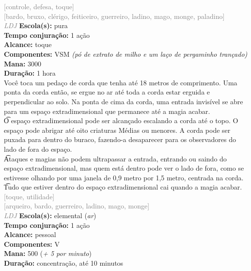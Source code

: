 \documentclass{RPG_Adventure}[2021/10/20]
\begin{document}
{\scriptsize \textcolor{gray}{[controle, defesa, toque]\\}}
{\scriptsize \textcolor{gray}{[bardo, bruxo, clérigo, feiticeiro, guerreiro, ladino, mago, monge, paladino]\\}}
{\tiny \textcolor{gray}{\textit{LDJ}}}\jump{}
{\small \t \textbf{Escola(s):} pura\\\t \textbf{Tempo conjuração:} 1 ação\\\t \textbf{Alcance:} toque\\\t \textbf{Componentes:} VSM \textit{(pó de extrato de milho e um laço de pergaminho trançado)}\\\t \textbf{Mana:} 3000\\\t \textbf{Duração:} 1 hora\\}
{\normalsize Você toca um pedaço de corda que tenha até 18 metros de comprimento. Uma ponta da corda então, se ergue no ar até toda a corda estar erguida e perpendicular ao solo. Na ponta de cima da corda, uma entrada invisível se abre para um espaço extradimensional que permanece até a magia acabar.\\\t O espaço extradimensional pode ser alcançado escalando a corda até o topo. O espaço pode abrigar até oito criaturas Médias ou menores. A corda pode ser puxada para dentro do buraco, fazendo-a desaparecer para os observadores do lado de fora do espaço.\\\t Ataques e magias não podem ultrapassar a entrada, entrando ou saindo do espaço extradimensional, mas quem está dentro pode ver o lado de fora, como se estivesse olhando por uma janela de 0,9 metro por 1,5 metro, centrada na corda.\\\t Tudo que estiver dentro do espaço extradimensional cai quando a magia acabar.\\}
{\scriptsize \textcolor{gray}{[toque, utilidade]\\}}
{\scriptsize \textcolor{gray}{[arqueiro, bardo, guerreiro, ladino, mago, monge]\\}}
{\tiny \textcolor{gray}{\textit{LDJ}}}\jump{}
{\small \t \textbf{Escola(s):} elemental (\textit{ar})\\\t \textbf{Tempo conjuração:} 1 ação\\\t \textbf{Alcance:} pessoal\\\t \textbf{Componentes:} V\\\t \textbf{Mana:} 500 (\textit{+ 5 por minuto})\\\t \textbf{Duração:} concentração, até 10 minutos\\}
\end{document}
